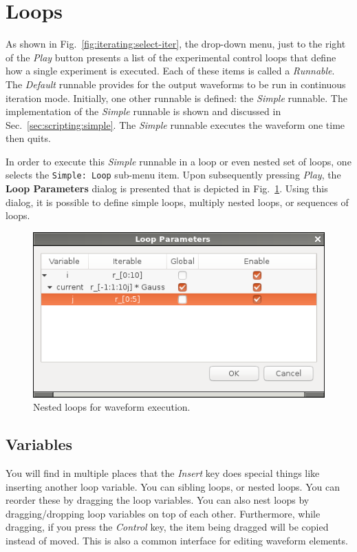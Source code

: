 \section{Loops}
As shown in Fig.~\ref{fig:iterating:select-iter}, the drop-down menu, just to
the right of the \textit{Play} button presents a list of the experimental
control loops that define how a single experiment is executed.  Each of these
items is called a \textit{Runnable}.  The \textit{Default} runnable provides for
the output waveforms to be run in continuous iteration mode.  Initially, one
other runnable is defined: the \textit{Simple} runnable.  The implementation of
the \textit{Simple} runnable is shown and discussed in
Sec.~\ref{sec:scripting:simple}.  The \textit{Simple} runnable executes the
waveform one time then quits.

In order to execute this \textit{Simple} runnable in a loop or even nested set
of loops, one selects the \texttt{Simple: Loop} sub-menu item.  Upon
subsequently pressing \textit{Play}, the \textbf{Loop Parameters} dialog is
presented that is depicted in Fig.~\ref{fig:iterating:nested-loops}.  Using this
dialog, it is possible to define simple loops, multiply nested loops, or
sequences of loops.

\begin{figure}[ht!]
  \centerline{\includegraphics[width=.45\textwidth]{figures/nested-loops}}
  \caption{
    Nested loops for waveform execution.
  }
  \label{fig:iterating:nested-loops}
\end{figure}

\subsection{Variables}

You will find in multiple places that the \textit{Insert} key does special
things like inserting another loop variable.  You can sibling loops, or nested
loops.  You can reorder these by dragging the loop variables.  You can also nest
loops by dragging/dropping loop variables on top of each other.  Furthermore,
while dragging, if you press the \textit{Control} key, the item being dragged
will be copied instead of moved.  This is also a common interface for editing
waveform elements.


